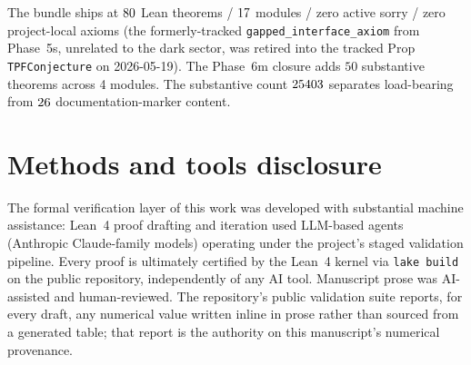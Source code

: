 \documentclass[aps,prd,reprint,nofootinbib,superscriptaddress]{revtex4-2}
\begin{document}
The bundle ships at $80$ Lean theorems / $17$
modules / zero active sorry / zero project-local axioms
(the formerly-tracked \texttt{gapped\_interface\_axiom} from Phase~5s,
unrelated to the dark sector, was retired into the tracked Prop
\texttt{TPFConjecture} on 2026-05-19). The Phase~6m closure adds $50$ substantive theorems
across 4 modules. The substantive count $25403$
separates load-bearing from $26$ documentation-marker
content.

\section*{Methods and tools disclosure}
The formal verification layer of this work was developed with
substantial machine assistance: Lean~4 proof drafting and iteration
used LLM-based agents (Anthropic Claude-family models) operating under
the project's staged validation pipeline. Every proof is ultimately
certified by the Lean~4 kernel via \texttt{lake build} on the public
repository, independently of any AI tool. Manuscript prose was AI-assisted and human-reviewed.
The repository's public validation suite reports, for every
draft, any numerical value written inline in prose rather than
sourced from a generated table; that report is the authority on
this manuscript's numerical provenance.
\end{document}
